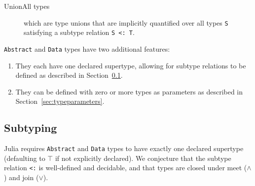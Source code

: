 \documentclass[pldi]{sigplanconf-pldi15}
\begin{document}
\begin{description}

\item[UnionAll types] which are type unions that are implicitly quantified over
	all types \verb|S| satisfying a subtype relation \verb|S <: T|.

\end{description}

\verb|Abstract| and \verb|Data| types have two additional features:

\begin{enumerate}
	\item They each have one declared supertype, allowing for subtype
	relations to be defined as described in Section~\ref{sec:subtyping}.

	\item They can be defined with zero or more types as parameters as
	described in Section~\ref{sec:typeparameters}.
\end{enumerate}


\subsection{Subtyping}
\label{sec:subtyping}

Julia requires \verb|Abstract| and \verb|Data| types to have exactly one
declared supertype (defaulting to $\top$ if not explicitly declared).
We conjecture that the subtype relation \verb|<:| is well-defined and
decidable, and that types are closed under meet ($\wedge$) and
join ($\vee$).

\end{document}
